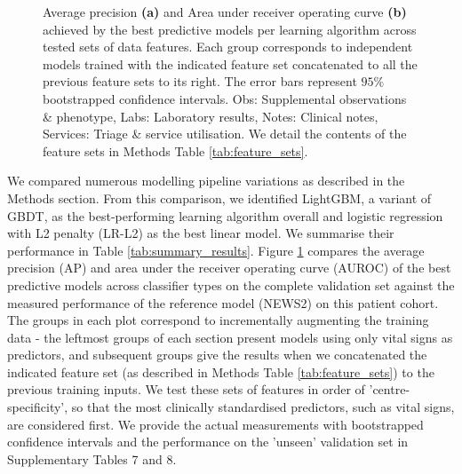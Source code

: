 \documentclass[fleqn,10pt]{wlscirep}
\begin{document}
\begin{figure}[htbp]
    \centering
    
    
    \caption{Average precision \textbf{(a)} and Area under receiver operating curve \textbf{(b)} achieved by the best predictive models per learning algorithm across tested sets of data features. Each group corresponds to independent models trained with the indicated feature set concatenated to all the previous feature sets to its right. The error bars represent $95\%$ bootstrapped confidence intervals. Obs: Supplemental observations \& phenotype, Labs: Laboratory results, Notes: Clinical notes, Services: Triage \& service utilisation. We detail the contents of the feature sets in Methods Table \ref{tab:feature_sets}.}
    \label{fig:score_barplots}
\end{figure}

We compared numerous modelling pipeline variations as described in the Methods section. From this comparison, we identified LightGBM, a variant of GBDT, as the best-performing learning algorithm overall and logistic regression with L2 penalty (LR-L2) as the best linear model. We summarise their performance in Table \ref{tab:summary_results}. Figure \ref{fig:score_barplots} compares the average precision (AP) and area under the receiver operating curve (AUROC) of the best predictive models across classifier types on the complete validation set against the measured performance of the reference model (NEWS2) on this patient cohort. The groups in each plot correspond to incrementally augmenting the training data - the leftmost groups of each section present models using only vital signs as predictors, and subsequent groups give the results when we concatenated the indicated feature set (as described in Methods Table \ref{tab:feature_sets}) to the previous training inputs. We test these sets of features in order of 'centre-specificity', so that the most clinically standardised predictors, such as vital signs, are considered first. We provide the actual measurements with bootstrapped confidence intervals and the performance on the 'unseen' validation set in Supplementary Tables 7 and 8.
\end{document}
